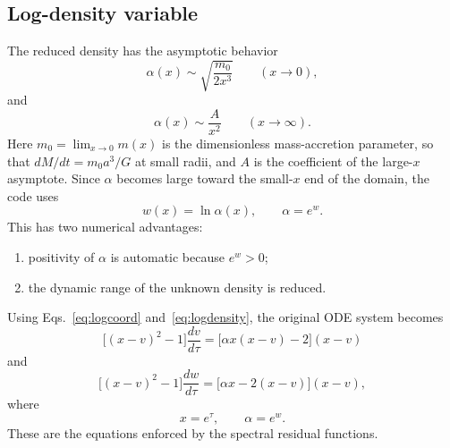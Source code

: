 \documentclass[11pt,a4paper]{article}
\begin{document}
\subsection{Log-density variable}

The reduced density has the asymptotic behavior
\begin{equation}
\alpha(x)
\sim
\sqrt{\frac{m_0}{2x^3}}
\qquad (x\rightarrow0),
\label{eq:asym0}
\end{equation}
and
\begin{equation}
\alpha(x)\sim\frac{A}{x^2}
\qquad (x\rightarrow\infty).
\label{eq:asyminf}
\end{equation}
Here $m_0=\lim_{x\to0}m(x)$ is the dimensionless mass-accretion
parameter, so that $dM/dt=m_0a^3/G$ at small radii, and $A$ is the
coefficient of the large-$x$ asymptote. Since $\alpha$ becomes large
toward the small-$x$ end of the domain, the code uses
\begin{equation}
w(x)=\ln\alpha(x),
\qquad
\alpha=e^w.
\label{eq:logdensity}
\end{equation}
This has two numerical advantages:
\begin{enumerate}
\item positivity of $\alpha$ is automatic because $e^w>0$;
\item the dynamic range of the unknown density is reduced.
\end{enumerate}
Using Eqs.~\eqref{eq:logcoord} and~\eqref{eq:logdensity}, the original
ODE system becomes
\begin{equation}
\boxed{
\bigl[(x-v)^2-1\bigr]\frac{dv}{d\tau}
=
\bigl[\alpha x(x-v)-2\bigr](x-v)
}
\label{eq:odevt}
\end{equation}
and
\begin{equation}
\boxed{
\bigl[(x-v)^2-1\bigr]\frac{dw}{d\tau}
=
\bigl[\alpha x-2(x-v)\bigr](x-v),
}
\label{eq:odewt}
\end{equation}
where
\begin{equation}
x=e^\tau,
\qquad
\alpha=e^w.
\end{equation}
These are the equations enforced by the spectral residual functions.

\end{document}
